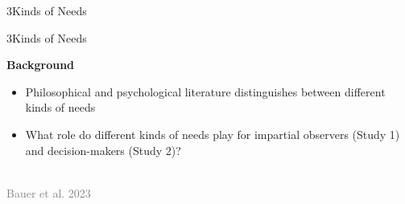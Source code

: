 \documentclass[xcolor=table,9pt,aspectratio=169]{beamer}
\begin{document}
\begin{frame}
\begin{overlayarea}{\textwidth}{0.81\paperheight}{
   \vspace*{11mm}
   \textcolor{uolblue}
   {3\hspace*{1em}Kinds of Needs}
}
\end{overlayarea}
\end{frame}


\begin{frame}{\vspace*{10mm}3\hspace*{1em}Kinds of Needs}
\begin{multicols}{2}
   \textbf{Background}\\
   \medskip
   \begin{itemize}
      \item Philosophical and psychological literature distinguishes between different kinds of needs
      \item What role do different kinds of needs play for impartial observers (Study 1) and decision-makers (Study 2)?
   \end{itemize}
   \vfill
   \begin{center}
      \\
      \textcolor{gray}{Bauer et al. 2023}
   \end{center}
\end{multicols}
\end{frame}
\end{document}
